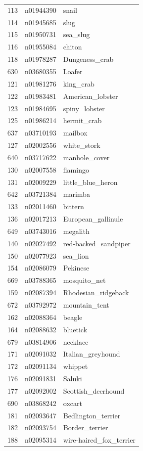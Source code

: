 \begin{table}
\begin{tabular}{cll}
113 & n01944390 & snail \\
114 & n01945685 & slug \\
115 & n01950731 & sea_slug \\
116 & n01955084 & chiton \\
118 & n01978287 & Dungeness_crab \\
630 & n03680355 & Loafer \\
121 & n01981276 & king_crab \\
122 & n01983481 & American_lobster \\
123 & n01984695 & spiny_lobster \\
125 & n01986214 & hermit_crab \\
637 & n03710193 & mailbox \\
127 & n02002556 & white_stork \\
640 & n03717622 & manhole_cover \\
130 & n02007558 & flamingo \\
131 & n02009229 & little_blue_heron \\
642 & n03721384 & marimba \\
133 & n02011460 & bittern \\
136 & n02017213 & European_gallinule \\
649 & n03743016 & megalith \\
140 & n02027492 & red-backed_sandpiper \\
150 & n02077923 & sea_lion \\
154 & n02086079 & Pekinese \\
669 & n03788365 & mosquito_net \\
159 & n02087394 & Rhodesian_ridgeback \\
672 & n03792972 & mountain_tent \\
162 & n02088364 & beagle \\
164 & n02088632 & bluetick \\
679 & n03814906 & necklace \\
171 & n02091032 & Italian_greyhound \\
172 & n02091134 & whippet \\
176 & n02091831 & Saluki \\
177 & n02092002 & Scottish_deerhound \\
690 & n03868242 & oxcart \\
181 & n02093647 & Bedlington_terrier \\
182 & n02093754 & Border_terrier \\
188 & n02095314 & wire-haired_fox_terrier \\

\end{tabular}
\end{table}
